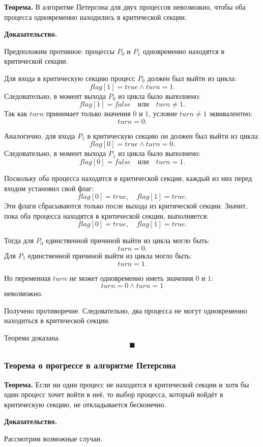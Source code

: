 \documentclass[12pt,a4paper]{article}
\begin{document}
\textbf{Теорема.}
В алгоритме Петерсона для двух процессов невозможно, чтобы оба процесса одновременно находились в критической секции.

\textbf{Доказательство.}

Предположим противное: процессы $P_0$ и $P_1$ одновременно находятся в критической секции.

Для входа в критическую секцию процесс $P_0$ должен был выйти из цикла:
\[
flag[1] = true \land turn = 1.
\]
Следовательно, в момент выхода $P_0$ из цикла было выполнено:
\[
flag[1] = false \quad \text{или} \quad turn \neq 1.
\]
Так как $turn$ принимает только значения $0$ и $1$, условие $turn \neq 1$ эквивалентно:
\[
turn = 0.
\]

Аналогично, для входа $P_1$ в критическую секцию он должен был выйти из цикла:
\[
flag[0] = true \land turn = 0.
\]
Следовательно, в момент выхода $P_1$ из цикла было выполнено:
\[
flag[0] = false \quad \text{или} \quad turn = 1.
\]

Поскольку оба процесса находятся в критической секции, каждый из них перед входом установил свой флаг:
\[
flag[0] = true,\quad flag[1] = true.
\]
Эти флаги сбрасываются только после выхода из критической секции. Значит, пока оба процесса находятся в критической секции, выполняется:
\[
flag[0] = true,\quad flag[1] = true.
\]

Тогда для $P_0$ единственной причиной выйти из цикла могло быть:
\[
turn = 0.
\]
Для $P_1$ единственной причиной выйти из цикла могло быть:
\[
turn = 1.
\]

Но переменная $turn$ не может одновременно иметь значения $0$ и $1$:
\[
turn = 0 \land turn = 1
\]
невозможно.

Получено противоречие. Следовательно, два процесса не могут одновременно находиться в критической секции.

Теорема доказана.
\[
\blacksquare
\]

\subsubsection{Теорема о прогрессе в алгоритме Петерсона}

\textbf{Теорема.}
Если ни один процесс не находится в критической секции и хотя бы один процесс хочет войти в неё, то выбор процесса, который войдёт в критическую секцию, не откладывается бесконечно.

\textbf{Доказательство.}

Рассмотрим возможные случаи.
\end{document}
